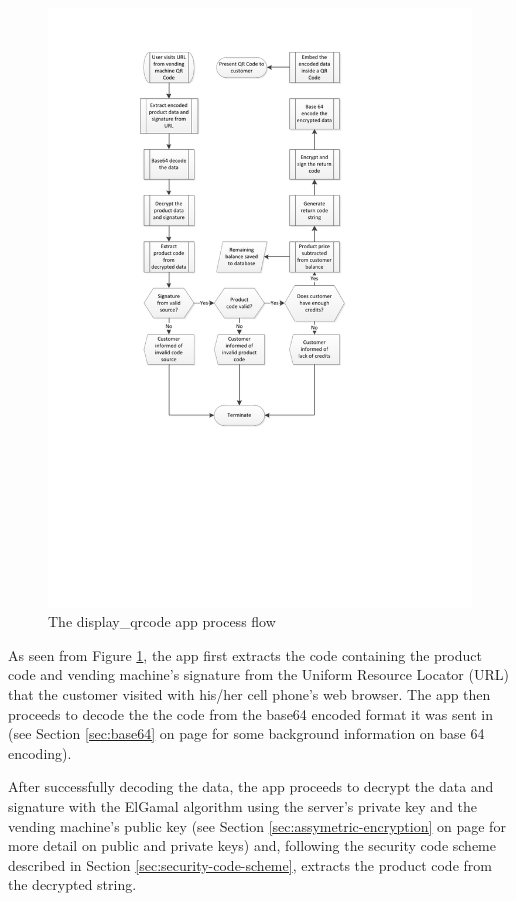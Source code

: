 \begin{figure}
 \centering 
 \includegraphics[clip=true, trim = 0 250 0 50,
 scale=0.7]{qrcode_processflow_server_bak}
 \caption{The display\_qrcode app process flow}
 \label{fig:disp-qrcode}
\end{figure}

As seen from Figure \ref{fig:disp-qrcode}, the app first extracts the code containing the
product code and vending machine's signature from the Uniform Resource Locator (URL) that the
customer visited with his/her cell phone's web browser. The app then proceeds to decode the
the code from the base64 encoded format it was sent in (see Section \ref{sec:base64} on
page \pageref{sec:base64} for some background information on base 64 encoding).

After successfully decoding the data, the app proceeds to decrypt the data and signature with the ElGamal
algorithm using the server's private key and the vending machine's public key
(see Section \ref{sec:assymetric-encryption} on page \pageref{sec:assymetric-encryption} for more detail on
public and private keys) and, following the security code scheme described in Section \ref{sec:security-code-scheme}, extracts the product
code from the decrypted string.

